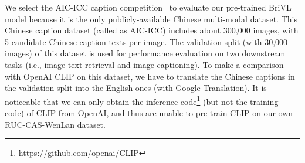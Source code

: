 \documentclass[10pt,twocolumn,letterpaper]{article}
\begin{document}
We select the AIC-ICC caption competition~\cite{wu2017ai} to evaluate our pre-trained BriVL model because it is the only publicly-available Chinese multi-modal dataset. This Chinese caption dataset (called as AIC-ICC) includes about 300,000 images, with 5 candidate Chinese caption texts per image. The validation split (with 30,000 images) of this dataset is used for performance evaluation on two downstream tasks (i.e., image-text retrieval and image captioning). To make a comparison with OpenAI CLIP on this dataset, we have to translate the Chinese captions in the validation split into the English ones (with Google Translation). It is noticeable that we can only obtain the inference code\footnote{https://github.com/openai/CLIP} (but not the training code) of CLIP from OpenAI, and thus are unable to pre-train CLIP on our own RUC-CAS-WenLan dataset.

\begin{table}[t]
    \centering
    \caption{Evaluation results for the text-image retrieval downstream task on the AIC-ICC validation set. }
    \vspace{0.03in}
    \label{tab:retrieval}
    \footnotesize
\end{table}

\begin{table}[t]
    \centering
    \caption{Evaluation results for the image captioning downstream task on the AIC-ICC validation set. $^*$ denotes the result obtained on the test set. }
    \vspace{0.03in}
    \label{tab:caption}
    \footnotesize
\end{table}
\end{document}
